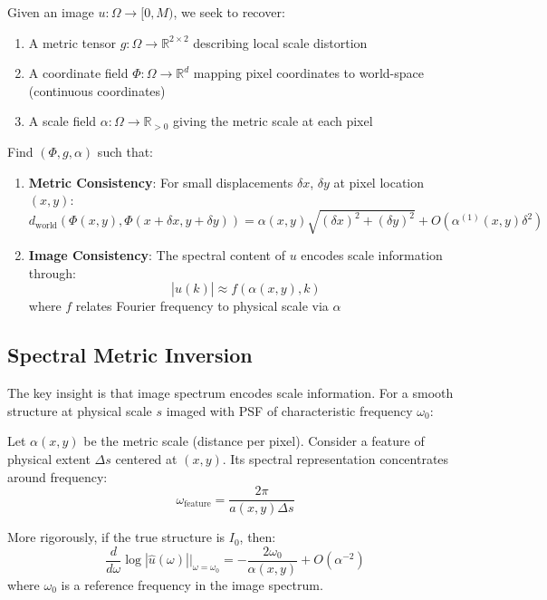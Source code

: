 \documentclass[twocolumn,11pt]{article}
\begin{document}
Given an image $u: \Omega \to [0, M)$, we seek to recover:
\begin{enumerate}
\item A metric tensor $g: \Omega \to \mathbb{R}^{2 \times 2}$ describing local scale distortion
\item A coordinate field $\Phi: \Omega \to \mathbb{R}^d$ mapping pixel coordinates to world-space (continuous coordinates)
\item A scale field $\alpha: \Omega \to \mathbb{R}_{>0}$ giving the metric scale at each pixel
\end{enumerate}

\begin{definition}
Find $(\Phi, g, \alpha)$ such that:
\begin{enumerate}
\item \textbf{Metric Consistency}: For small displacements $\delta x$, $\delta y$ at pixel location $(x,y)$:
\begin{equation}
d_{\text{world}}(\Phi(x,y), \Phi(x+\delta x, y+\delta y)) = \alpha(x,y) \sqrt{(\delta x)^2 + (\delta y)^2} + O(\alpha^{(1)}(x,y) \delta^2)
\end{equation}

\item \textbf{Image Consistency}: The spectral content of $u$ encodes scale information through:
\begin{equation}
|\hat{u}(k)| \approx f(\alpha(x,y), k)
\end{equation}
where $f$ relates Fourier frequency to physical scale via $\alpha$
\end{enumerate}
\end{definition}

\subsection{Spectral Metric Inversion}

The key insight is that image spectrum encodes scale information. For a smooth structure at physical scale $s$ imaged with PSF of characteristic frequency $\omega_0$:

\begin{theorem}
Let $\alpha(x,y)$ be the metric scale (distance per pixel). Consider a feature of physical extent $\Delta s$ centered at $(x,y)$. Its spectral representation concentrates around frequency:
\begin{equation}
\omega_{\text{feature}} = \frac{2\pi}{a(x,y) \Delta s}
\end{equation}

More rigorously, if the true structure is $I_0$, then:
\begin{equation}
\frac{d}{d\omega} \log |\hat{u}(\omega)| \Big|_{\omega=\omega_0} = -\frac{2\omega_0}{\alpha(x,y)} + O(\alpha^{-2})
\end{equation}
where $\omega_0$ is a reference frequency in the image spectrum.
\end{theorem}
\end{document}
